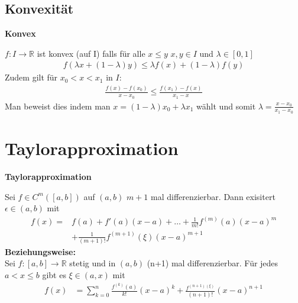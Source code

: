 \documentclass[25pt]{sciposter}
\newcommand{\R}{\mathbb{R}}
\newenvironment{method}[1]{\begin{mdframed}[backgroundcolor=blue!10,innertopmargin=15pt, innerbottommargin=15pt, nobreak=true]
		\textbf{#1 }
	}
	{ 
	\end{mdframed}
}
\begin{document}
\begin{multicols}{3}
\subsection*{Konvexität}

\begin{method}{Konvex}
	$f : I \to \R$ ist konvex (auf I) falls für alle $x \leq y$ $x,y \in I$ und $\lambda \in [0,1]$
	\begin{align*}
	f(\lambda x + (1-\lambda)y) \leq \lambda f(x) + (1-\lambda)f(y)
	\end{align*}
	Zudem gilt für $x_0 < x< x_1$ in $I$:
	\begin{align*}
	 \frac{f(x) - f(x_0)}{x-x_0} \leq \frac{f(x_1) - f(x)}{x_1 - x}
	\end{align*}
	Man beweist dies indem man $x = (1-\lambda) x_0 + \lambda x_1$ wählt und somit $\lambda = \frac{x-x_0}{x_1 - x_0}$
\end{method}

\section*{Taylorapproximation}

\begin{method}{Taylorapproximation}
Sei $f\in C^m ([a,b])$ auf $(a,b)$ $m+1$ mal differenzierbar. Dann exisitert $\epsilon \in (a,b)$ mit 
\begin{align*}
	f(x) =& f(a) + f'(a)(x-a) + \ldots + \frac{1}{m!} f^{(m)} (a) (x-a)^m\\ &+ \frac{1}{(m+1)!} f^{(m+1)}(\xi) (x-a)^{m+1}
\end{align*} 
 \textbf{Beziehungsweise:}\\
	Sei $f:[a,b] \to \R$ stetig und in $(a,b)$ (n+1) mal differenzierbar. Für jedes $a<x\leq b$ gibt es $\xi \in (a,x)$ mit
	\begin{align*}
	f(x) &= \sum_{k=0}^n \frac{f^{(k)}(a)}{k!} (x-a)^k + \frac{f^{(n+1)(\xi)}}{(n+1)!} (x-a)^{n+1}
	\end{align*}

\end{method}


\end{multicols}
\end{document}
